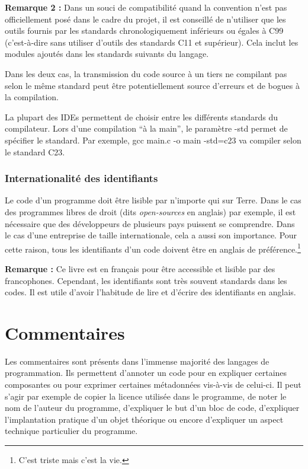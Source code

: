 \documentclass[../../../main.tex]{subfiles}
\begin{document}
\textbf{Remarque 2 :} Dans un souci de compatibilité quand la convention n'est pas officiellement posé dans le cadre du projet, il est conseillé de n'utiliser que les outils fournis par les standards chronologiquement inférieurs ou égales à C99 (c'est-à-dire sans utiliser d'outils des standards C11 et supérieur). Cela inclut les modules ajoutés dans les standards suivants du langage.
 
Dans les deux cas, la transmission du code source à un tiers ne compilant pas selon le même standard peut être potentiellement source d'erreurs et de bogues à la compilation.
 
La plupart des IDEs permettent de choisir entre les différents standards du compilateur. Lors d'une compilation ``à la main'', le paramètre \textsf{-std} permet de spécifier le standard. Par exemple, \textsf{gcc main.c -o main -std=c23} va compiler selon le standard C23.
 
\subsubsection{Internationalité des identifiants}
 
Le code d'un programme doit être lisible par n'importe qui sur Terre. Dans le cas des programmes libres de droit (dits \textit{open-sources} en anglais) par exemple, il est nécessaire que des développeurs de plusieurs pays puissent se comprendre. Dans le cas d'une entreprise de taille internationale, cela a aussi son importance. Pour cette raison, tous les identifiants d'un code doivent être en anglais de préférence.\footnote{C'est triste mais c'est la vie.}

\textbf{Remarque :} Ce livre est en français pour être accessible et lisible par des francophones. Cependant, les identifiants sont très souvent standards dans les codes. Il est utile d'avoir l'habitude de lire et d'écrire des identifiants en anglais.
\section{Commentaires}
Les commentaires sont présents dans l'immense majorité des langages de programmation. Ils permettent d'annoter un code pour en expliquer certaines composantes ou pour exprimer certaines métadonnées vis-à-vis de celui-ci. Il peut s'agir par exemple de copier la licence utilisée dans le programme, de noter le nom de l'auteur du programme, d'expliquer le but d'un bloc de code, d'expliquer l'implantation pratique d'un objet théorique ou encore d'expliquer un aspect technique particulier du programme.
 
\end{document}
